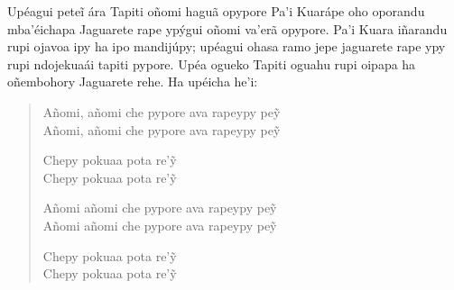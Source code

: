 Upéagui peteĩ ára Tapiti oñomi haguã opypore Pa'i Kuarápe oho oporandu
mba'éichapa Jaguarete rape ypýgui oñomi va'erã opypore. Pa'i Kuara
iñarandu rupi ojavoa ipy ha ipo mandijúpy; upéagui ohasa ramo jepe
jaguarete rape ypy rupi ndojekuaái tapiti pypore. Upéa ogueko Tapiti
oguahu rupi oipapa ha oñembohory Jaguarete rehe. Ha upéicha he'i:

\begin{verse}
Añomi, añomi che pypore ava rapeypy peỹ\\
Añomi, añomi che pypore ava rapeypy peỹ

Chepy pokuaa pota re'ỹ\\
Chepy pokuaa pota re'ỹ

Añomi añomi che pypore ava rapeypy peỹ\\
Añomi añomi che pypore ava rapeypy peỹ

Chepy pokuaa pota re'ỹ\\
Chepy pokuaa pota re'ỹ
\end{verse}